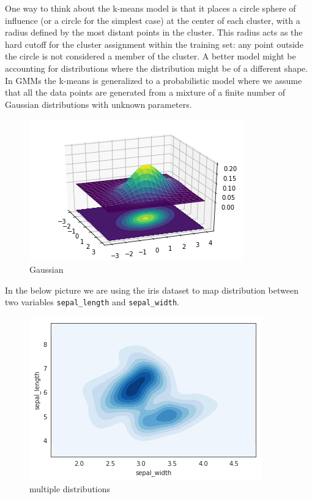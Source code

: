 \documentclass{book}
\begin{document}
One way to think about the k-means model is that it places a circle sphere of influence (or a circle for the simplest case) at the center of each cluster, with a radius defined by the most distant points in the cluster. This radius acts as the hard cutoff for the cluster assignment within the training set: any point outside the circle is not considered a member of the cluster. A better model might be accounting for distributions where the distribution might be of a different shape. In GMMs the k-means is generalized to a probabilistic model where we assume that all the data points are generated from a mixture of a finite number of Gaussian distributions with unknown parameters.

\begin{figure}[htpb]
	\centering
	\includegraphics[width=0.8\linewidth]{gaussian_dist.png}
	\caption{Gaussian}
	\label{fig:gaussian}
\end{figure}

In the below picture we are using the iris dataset to map distribution between two variables \lstinline{sepal_length} and \lstinline{sepal_width}.

\begin{figure}[htpb]
	\centering
	\includegraphics[width=0.8\linewidth]{multiple_contours.png}
	\caption{multiple distributions}
	\label{fig:multiple_distributions}
\end{figure}
\end{document}
